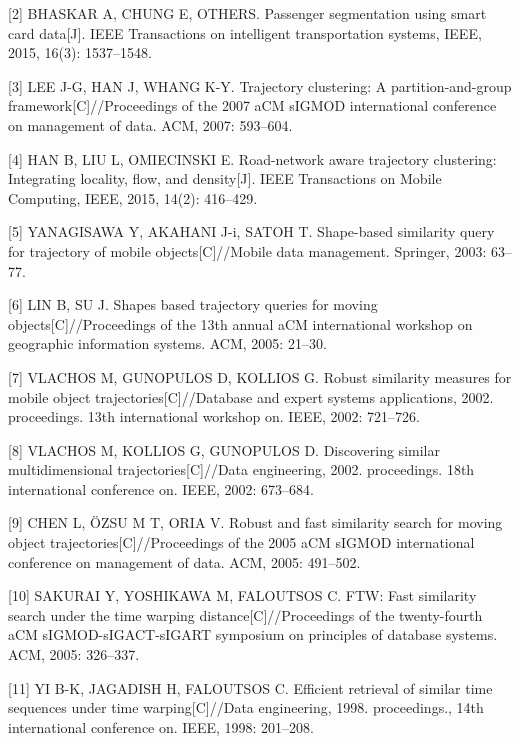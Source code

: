 \documentclass[]{article}
\begin{document}
\hypertarget{ref-bhaskar2015passenger}{}
{[}2{]} BHASKAR A, CHUNG E, OTHERS. Passenger segmentation using smart
card data{[}J{]}. IEEE Transactions on intelligent transportation
systems, IEEE, 2015, 16(3): 1537--1548.

\hypertarget{ref-lee2007trajectory}{}
{[}3{]} LEE J-G, HAN J, WHANG K-Y. Trajectory clustering: A
partition-and-group framework{[}C{]}//Proceedings of the 2007 aCM sIGMOD
international conference on management of data. ACM, 2007: 593--604.

\hypertarget{ref-han2015road}{}
{[}4{]} HAN B, LIU L, OMIECINSKI E. Road-network aware trajectory
clustering: Integrating locality, flow, and density{[}J{]}. IEEE
Transactions on Mobile Computing, IEEE, 2015, 14(2): 416--429.

\hypertarget{ref-yanagisawa2003shape}{}
{[}5{]} YANAGISAWA Y, AKAHANI J-i, SATOH T. Shape-based similarity query
for trajectory of mobile objects{[}C{]}//Mobile data management.
Springer, 2003: 63--77.

\hypertarget{ref-lin2005shapes}{}
{[}6{]} LIN B, SU J. Shapes based trajectory queries for moving
objects{[}C{]}//Proceedings of the 13th annual aCM international
workshop on geographic information systems. ACM, 2005: 21--30.

\hypertarget{ref-vlachos2002robust}{}
{[}7{]} VLACHOS M, GUNOPULOS D, KOLLIOS G. Robust similarity measures
for mobile object trajectories{[}C{]}//Database and expert systems
applications, 2002. proceedings. 13th international workshop on. IEEE,
2002: 721--726.

\hypertarget{ref-vlachos2002discovering}{}
{[}8{]} VLACHOS M, KOLLIOS G, GUNOPULOS D. Discovering similar
multidimensional trajectories{[}C{]}//Data engineering, 2002.
proceedings. 18th international conference on. IEEE, 2002: 673--684.

\hypertarget{ref-chen2005robust}{}
{[}9{]} CHEN L, ÖZSU M T, ORIA V. Robust and fast similarity search for
moving object trajectories{[}C{]}//Proceedings of the 2005 aCM sIGMOD
international conference on management of data. ACM, 2005: 491--502.

\hypertarget{ref-sakurai2005ftw}{}
{[}10{]} SAKURAI Y, YOSHIKAWA M, FALOUTSOS C. FTW: Fast similarity
search under the time warping distance{[}C{]}//Proceedings of the
twenty-fourth aCM sIGMOD-sIGACT-sIGART symposium on principles of
database systems. ACM, 2005: 326--337.

\hypertarget{ref-yi1998efficient}{}
{[}11{]} YI B-K, JAGADISH H, FALOUTSOS C. Efficient retrieval of similar
time sequences under time warping{[}C{]}//Data engineering, 1998.
proceedings., 14th international conference on. IEEE, 1998: 201--208.
\end{document}
